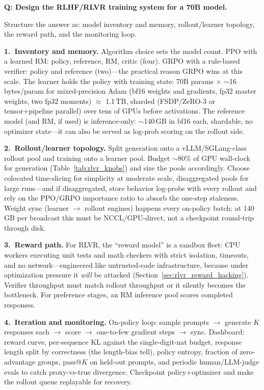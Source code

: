 \begin{interviewq}
\textbf{Q: Design the RLHF/RLVR training system for a 70B model.}

 \quad {} \quad
\badgefreq{\freqhigh}

\stronganswer
Structure the answer as: model inventory and memory, rollout/learner
topology, the reward path, and the monitoring loop.

\textbf{1.~Inventory and memory.}  Algorithm choice sets the model count.
PPO with a learned RM: policy, reference, RM, critic (four).  GRPO with a
rule-based verifier: policy and reference (two)---the practical reason
GRPO wins at this scale.  The learner holds the policy with training
state: 70B params $\times$ $\sim$16 bytes/param for mixed-precision Adam
(bf16 weights and gradients, fp32 master weights, two fp32 moments)
$\approx$ 1.1\,TB,
sharded (FSDP/ZeRO-3 or tensor+pipeline parallel) over tens of GPUs
before activations.  The reference model (and RM, if used) is
inference-only: $\sim$140\,GB in bf16 each, shardable, no optimizer
state---it can also be served as log-prob scoring on the rollout side.

\textbf{2.~Rollout/learner topology.}  Split generation onto a
vLLM/SGLang-class rollout pool and training onto a learner pool.  Budget
$\sim$80\% of GPU wall-clock for generation (Table~\ref{tab:rlvr_knobs})
and size the pools accordingly.  Choose colocated time-slicing for
simplicity at moderate scale, disaggregated pools for large runs---and
if disaggregated, store behavior log-probs with every rollout and rely
on the PPO/GRPO importance ratio to absorb the one-step staleness.
Weight sync (learner $\to$ rollout engines) happens every on-policy
batch; at 140\,GB per broadcast this must be NCCL/GPU-direct, not a
checkpoint round-trip through disk.

\textbf{3.~Reward path.}  For RLVR, the ``reward model'' is a sandbox
fleet: CPU workers executing unit tests and math checkers with strict
isolation, timeouts, and no network---engineered like untrusted-code
infrastructure, because under optimization pressure it \emph{will} be
attacked (Section~\ref{sec:rlvr_reward_hacking}).  Verifier throughput
must match rollout throughput or it silently becomes the bottleneck.
For preference stages, an RM inference pool scores completed responses.

\textbf{4.~Iteration and monitoring.}  On-policy loop: sample prompts
$\to$ generate $K$ responses each $\to$ score $\to$ one-to-few gradient
steps $\to$ sync.  Dashboard: reward curve, per-sequence KL against the
single-digit-nat budget, response length split by correctness (the
length-bias tell), policy entropy, fraction of zero-advantage groups,
pass@$K$ on held-out prompts, and periodic human/LLM-judge evals to
catch proxy-vs-true divergence.  Checkpoint policy+optimizer and make
the rollout queue replayable for recovery.


\end{interviewq}
